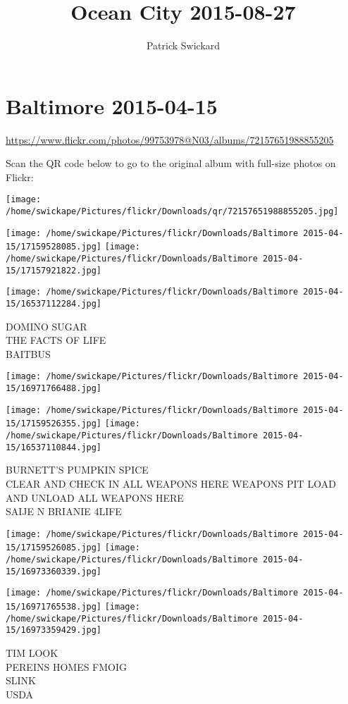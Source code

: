 \documentclass[10pt,letterpaper]{article}
\title{Ocean City 2015-08-27}
\author{Patrick Swickard}
\date{}
\begin{document}
\section*{Baltimore 2015-04-15}

\url{https://www.flickr.com/photos/99753978@N03/albums/72157651988855205}

Scan the QR code below to go to the original album with full-size photos on Flickr:

\texttt{[image: /home/swickape/Pictures/flickr/Downloads/qr/72157651988855205.jpg]}
\pagebreak

\texttt{[image: /home/swickape/Pictures/flickr/Downloads/Baltimore 2015-04-15/17159528085.jpg]}
\texttt{[image: /home/swickape/Pictures/flickr/Downloads/Baltimore 2015-04-15/17157921822.jpg]}

\texttt{[image: /home/swickape/Pictures/flickr/Downloads/Baltimore 2015-04-15/16537112284.jpg]}

DOMINO SUGAR\\
THE FACTS OF LIFE\\
BAITBUS
\pagebreak

\texttt{[image: /home/swickape/Pictures/flickr/Downloads/Baltimore 2015-04-15/16971766488.jpg]}

\vspace{0.25in}
\texttt{[image: /home/swickape/Pictures/flickr/Downloads/Baltimore 2015-04-15/17159526355.jpg]}
\texttt{[image: /home/swickape/Pictures/flickr/Downloads/Baltimore 2015-04-15/16537110844.jpg]}

BURNETT'S PUMPKIN SPICE\\
CLEAR AND CHECK IN ALL WEAPONS HERE WEAPONS PIT LOAD AND UNLOAD ALL WEAPONS HERE\\
SAIJE N BRIANIE 4LIFE
\pagebreak

\texttt{[image: /home/swickape/Pictures/flickr/Downloads/Baltimore 2015-04-15/17159526085.jpg]}
\texttt{[image: /home/swickape/Pictures/flickr/Downloads/Baltimore 2015-04-15/16973360339.jpg]}

\texttt{[image: /home/swickape/Pictures/flickr/Downloads/Baltimore 2015-04-15/16971765538.jpg]}
\texttt{[image: /home/swickape/Pictures/flickr/Downloads/Baltimore 2015-04-15/16973359429.jpg]}

TIM LOOK\\
PEREINS HOMES FMOIG\\
SLINK\\
USDA
\pagebreak
\end{document}
